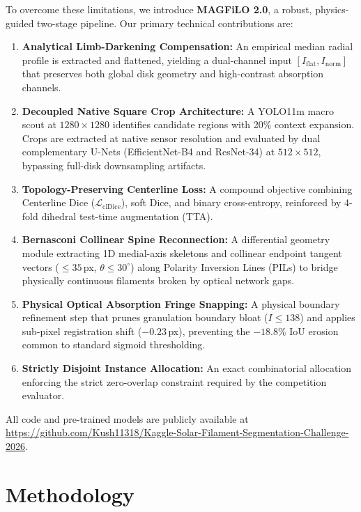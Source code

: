 \documentclass[sigconf]{acmart}
\begin{document}
    To overcome these limitations, we introduce \textbf{MAGFiLO 2.0}, a robust, physics-guided two-stage pipeline. Our primary technical contributions are:
    \begin{enumerate}
        \item \textbf{Analytical Limb-Darkening Compensation:} An empirical median radial profile is extracted and flattened, yielding a dual-channel input $[I_{\text{flat}}, I_{\text{norm}}]$ that preserves both global disk geometry and high-contrast absorption channels.
        \item \textbf{Decoupled Native Square Crop Architecture:} A YOLO11m macro scout at $1280\times1280$ identifies candidate regions with 20\% context expansion. Crops are extracted at native sensor resolution and evaluated by dual complementary U-Nets (EfficientNet-B4 and ResNet-34) at $512\times512$, bypassing full-disk downsampling artifacts.
        \item \textbf{Topology-Preserving Centerline Loss:} A compound objective combining Centerline Dice ($\mathcal{L}_{\text{clDice}}$), soft Dice, and binary cross-entropy, reinforced by 4-fold dihedral test-time augmentation (TTA).
        \item \textbf{Bernasconi Collinear Spine Reconnection:} A differential geometry module extracting 1D medial-axis skeletons and collinear endpoint tangent vectors ($\le 35$\,px, $\theta \le 30^\circ$) along Polarity Inversion Lines (PILs) to bridge physically continuous filaments broken by optical network gaps.
        \item \textbf{Physical Optical Absorption Fringe Snapping:} A physical boundary refinement step that prunes granulation boundary bloat ($I \le 138$) and applies sub-pixel registration shift ($-0.23$\,px), preventing the $-18.8\%$ IoU erosion common to standard sigmoid thresholding.
        \item \textbf{Strictly Disjoint Instance Allocation:} An exact combinatorial allocation enforcing the strict zero-overlap constraint required by the competition evaluator.
    \end{enumerate}
    All code and pre-trained models are publicly available at \url{https://github.com/Kush11318/Kaggle-Solar-Filament-Segmentation-Challenge-2026}.

\section{Methodology}\label{sec:methodology}
\end{document}
